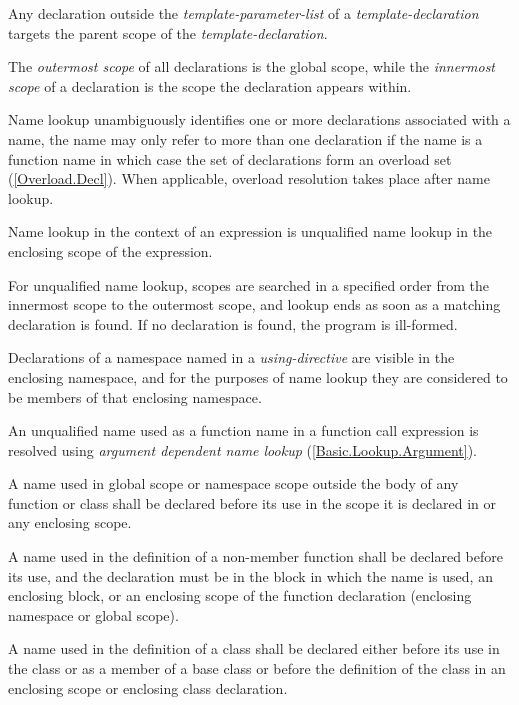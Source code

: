 \p Any declaration outside the \textit{template-parameter-list} of a
\textit{template-declaration} targets the parent scope of the
\textit{template-declaration}.

\p The \textit{outermost scope} of all declarations is the global scope, while
the \textit{innermost scope} of a declaration is the scope the declaration
appears within.


\p Name lookup unambiguously identifies one or more declarations associated with
a name, the name may only refer to more than one declaration if the name is a
function name in which case the set of declarations form an overload set
(\ref{Overload.Decl}). When applicable, overload resolution takes place after
name lookup.

\p Name lookup in the context of an expression is unqualified name lookup in the
enclosing scope of the expression.


\p For unqualified name lookup, scopes are searched in a specified order from
the innermost scope to the outermost scope, and lookup ends as soon as a
matching declaration is found. If no declaration is found, the program is
ill-formed.

\p Declarations of a namespace named in a \textit{using-directive} are visible
in the enclosing namespace, and for the purposes of name lookup they are
considered to be members of that enclosing namespace.

\p An unqualified name used as a function name in a function call expression is
resolved using \textit{argument dependent name lookup} (\ref{Basic.Lookup.Argument}).

\p A name used in global scope or namespace scope outside the body of any
function or class shall be declared before its use in the scope it is declared
in or any enclosing scope.

\p A name used in the definition of a non-member function shall be declared
before its use, and the declaration must be in the block in which the name is
used, an enclosing block, or an enclosing scope of the function declaration
(enclosing namespace or global scope).

\p A name used in the definition of a class shall be declared either before its
use in the class or as a member of a base class or before the definition of the
class in an enclosing scope or enclosing class declaration.

